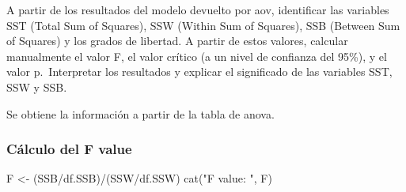 \documentclass[
]{article}
\newenvironment{Shaded}{\begin{snugshade}}{\end{snugshade}}
\newcommand{\CommentTok}[1]{\textcolor[rgb]{0.56,0.35,0.01}{\textit{#1}}}
\newcommand{\DecValTok}[1]{\textcolor[rgb]{0.00,0.00,0.81}{#1}}
\newcommand{\FunctionTok}[1]{\textcolor[rgb]{0.00,0.00,0.00}{#1}}
\newcommand{\NormalTok}[1]{#1}
\newcommand{\OtherTok}[1]{\textcolor[rgb]{0.56,0.35,0.01}{#1}}
\newcommand{\SpecialCharTok}[1]{\textcolor[rgb]{0.00,0.00,0.00}{#1}}
\newcommand{\StringTok}[1]{\textcolor[rgb]{0.31,0.60,0.02}{#1}}
\begin{document}
A partir de los resultados del modelo devuelto por aov, identificar las
variables SST (Total Sum of Squares), SSW (Within Sum of Squares), SSB
(Between Sum of Squares) y los grados de libertad. A partir de estos
valores, calcular manualmente el valor F, el valor crítico (a un nivel
de confianza del 95\%), y el valor p.~Interpretar los resultados y
explicar el significado de las variables SST, SSW y SSB.

\vspace{0.3cm}

Se obtiene la información a partir de la tabla de anova.

\vspace{0.3cm}

\begin{Shaded}
\end{Shaded}

\vspace{0.3cm}

\hypertarget{cuxe1lculo-del-f-value}{%
\subsubsection{Cálculo del F value}\label{cuxe1lculo-del-f-value}}

\vspace{0.3cm}

\begin{Shaded}
\begin{Highlighting}[]
\NormalTok{F }\OtherTok{\textless{}{-}}\NormalTok{ (SSB}\SpecialCharTok{/}\NormalTok{df.SSB)}\SpecialCharTok{/}\NormalTok{(SSW}\SpecialCharTok{/}\NormalTok{df.SSW)}
\FunctionTok{cat}\NormalTok{(}\StringTok{"F value: "}\NormalTok{, F)}
\end{Highlighting}
\end{Shaded}
\end{document}

